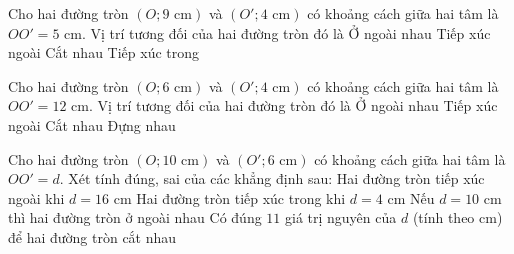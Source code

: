 
\begin{ex}%
	Cho hai đường tròn $(O; 9\text{ cm})$ và $(O'; 4\text{ cm})$ có khoảng cách giữa hai tâm là $OO' = 5\text{ cm}$. Vị trí tương đối của hai đường tròn đó là
	\choice
	{Ở ngoài nhau}
	{Tiếp xúc ngoài}
	{Cắt nhau}
	{\True Tiếp xúc trong}
\end{ex}

\begin{ex}%
	Cho hai đường tròn $(O; 6\text{ cm})$ và $(O'; 4\text{ cm})$ có khoảng cách giữa hai tâm là $OO' = 12\text{ cm}$. Vị trí tương đối của hai đường tròn đó là
	\choice
	{\True Ở ngoài nhau}
	{Tiếp xúc ngoài}
	{Cắt nhau}
	{Đựng nhau}
\end{ex}

\begin{ex}%
	Cho hai đường tròn $(O; 10\text{ cm})$ và $(O'; 6\text{ cm})$ có khoảng cách giữa hai tâm là $OO' = d$. Xét tính đúng, sai của các khẳng định sau:
	\choiceTF
	{\True Hai đường tròn tiếp xúc ngoài khi $d = 16\text{ cm}$}
	{\True Hai đường tròn tiếp xúc trong khi $d = 4\text{ cm}$}
	{Nếu $d = 10\text{ cm}$ thì hai đường tròn ở ngoài nhau}
	{\True Có đúng $11$ giá trị nguyên của $d$ (tính theo cm) để hai đường tròn cắt nhau}
\end{ex}

